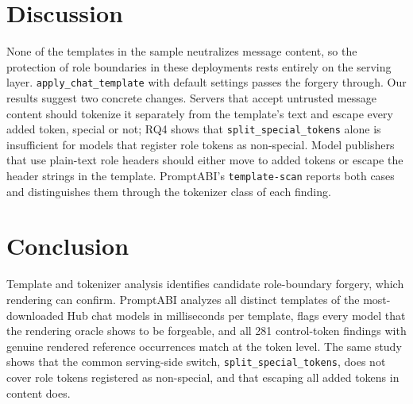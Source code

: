 \documentclass[10pt,conference]{IEEEtran}
\newcommand{\tool}{PromptABI\xspace}
\begin{document}
\section{Discussion}

None of the templates in the sample neutralizes message content, so the
protection of role boundaries in these deployments rests entirely on the
serving layer. \texttt{apply\_chat\_template} with default settings passes the
forgery through. Our results suggest two concrete changes. Servers that accept
untrusted message content should tokenize it separately from the template's
text and escape every added token, special or not; RQ4 shows that
\texttt{split\_special\_tokens} alone is insufficient for models that register
role tokens as non-special. Model publishers that use plain-text role headers
should either move to added tokens or escape the header strings in the
template. \tool's \texttt{template-scan} reports both cases and distinguishes
them through the tokenizer class of each finding.

\section{Conclusion}

Template and tokenizer analysis identifies candidate role-boundary
forgery, which rendering can confirm. \tool analyzes all \NTemplates{} distinct templates of
the \NModels{} most-downloaded Hub chat models in milliseconds per template,
flags every model that the rendering oracle shows to be forgeable, and all 281 control-token findings with genuine rendered reference
occurrences match at the token level. The same study shows
that the common serving-side switch, \texttt{split\_special\_tokens}, does not
cover role tokens registered as non-special, and that escaping all added tokens
in content does.



\end{document}
